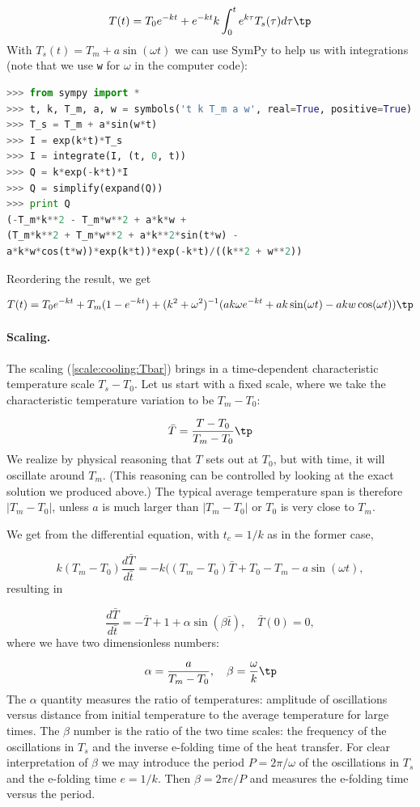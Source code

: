 \documentclass[graybox,envcountchap,sectrefs,final]{svmonodo}
\begin{document}
\[ T(t) = T_0e^{-kt} + e^{-kt}k\int_0^t e^{k\tau}T_s(\tau)d\tau\tp\]
With $T_s(t)=T_m + a\sin (\omega t)$ we can use SymPy to help us with
integrations (note that we use \texttt{w} for $\omega$ in the computer code):

\begin{lstlisting}[language=Python,style=graycolor]
>>> from sympy import *
>>> t, k, T_m, a, w = symbols('t k T_m a w', real=True, positive=True)
>>> T_s = T_m + a*sin(w*t)
>>> I = exp(k*t)*T_s
>>> I = integrate(I, (t, 0, t))
>>> Q = k*exp(-k*t)*I
>>> Q = simplify(expand(Q))
>>> print Q
(-T_m*k**2 - T_m*w**2 + a*k*w +
(T_m*k**2 + T_m*w**2 + a*k**2*sin(t*w) -
a*k*w*cos(t*w))*exp(k*t))*exp(-k*t)/((k**2 + w**2))
\end{lstlisting}
Reordering the result, we get

\[ T(t) = T_0e^{-kt} + T_m(1- e^{-kt}) +  (k^2 + \omega^2)^{-1}(ak\omega e^{-kt}
+ ak\sin (\omega t) - akw\cos(\omega t))\tp\]


\paragraph{Scaling.}
The scaling (\ref{scale:cooling:Tbar}) brings in a time-dependent
characteristic temperature scale $T_s-T_0$. Let us start with a
fixed scale, where we take the characteristic temperature variation to
be $T_m - T_0$:

\[ \bar T = \frac{T-T_0}{T_m-T_0}\tp\]
We realize by physical
reasoning that $T$ sets out at $T_0$, but with time, it will oscillate
around $T_m$. (This reasoning can be controlled by looking at the exact
solution we produced above.)
The typical average temperature span is therefore
$|T_m-T_0|$, unless $a$ is much larger than $|T_m-T_0|$ or $T_0$ is
very close to
$T_m$.

We get from the differential equation, with $t_c=1/k$ as in the former
case,

\[ k(T_m-T_0)\frac{d\bar T}{d\bar t} = -k((T_m-T_0)\bar T + T_0 - T_m - a
\sin(\omega t),\]
resulting in

\begin{equation}
\frac{d\bar T}{d\bar t} = -\bar T + 1 + \alpha\sin (\beta \bar t),\quad
\bar T(0)=0,
\label{scale:cooling:model:scaled}
\end{equation}
where we have two dimensionless numbers:

\[ \alpha = \frac{a}{T_m-T_0},\quad \beta = \frac{\omega}{k}\tp\]
The $\alpha$ quantity measures the ratio of temperatures: amplitude of
oscillations versus distance from initial temperature to the average
temperature for large times.  The $\beta$ number is the ratio of the
two time scales: the frequency of the oscillations in $T_s$ and the
inverse e-folding time of the heat transfer. For clear interpretation
of $\beta$ we may introduce the period $P=2\pi/\omega$ of the
oscillations in $T_s$ and the e-folding time $e=1/k$. Then $\beta =
2\pi e/P$ and measures the e-folding time versus the period.
\end{document}
